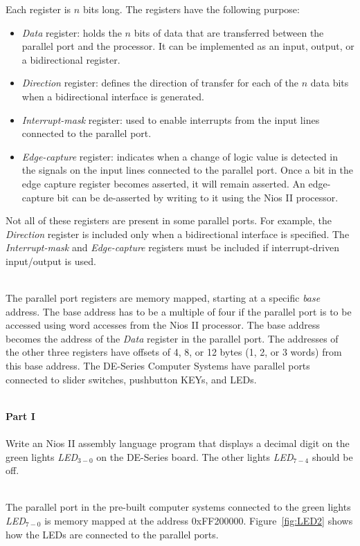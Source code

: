 \documentclass[epsfig,10pt,fullpage]{article}
\begin{document}
\noindent
Each register is $n$ bits long. The registers have the following purpose:
\begin{itemize}
\item {\it Data} register: holds the $n$ bits of data that are transferred between the parallel 
port and the processor. It can be implemented as an input, output, or a bidirectional register.
\item {\it Direction} register: defines the direction of transfer for each of the $n$
data bits when a bidirectional interface is generated.
\item {\it Interrupt-mask} register: used to enable interrupts from the
input lines connected to the parallel port.
\item {\it Edge-capture} register: indicates when a change of logic value is detected in 
the signals on the input lines connected to the parallel port. Once a bit in the edge
capture register becomes asserted, it will remain asserted. An edge-capture bit can be
de-asserted by writing to it using the Nios II processor.
\end{itemize}
\noindent
Not all of these registers are present in some parallel ports. For example,
the {\it Direction} register is included only when a bidirectional interface is specified.
The {\it Interrupt-mask} and {\it Edge-capture} registers must be included if
interrupt-driven input/output is used.

~\\
The parallel port registers are memory mapped, starting at a specific {\it base} address.
The base address has to be a multiple of four if the parallel port is to be accessed using
word accesses from the Nios II processor. The base address becomes the address of the {\it Data} 
register in the parallel port. The addresses of the other three registers have offsets 
of 4, 8, or 12 bytes (1, 2, or 3 words) from this base address.
The DE-Series Computer Systems have parallel ports connected to slider switches, pushbutton KEYs,
and LEDs.

~\\
\noindent
{\bf Part I}
~\\
~\\
\noindent
Write an Nios II assembly language program that displays a decimal digit on the green 
lights {\it LED}$_{3-0}$ on the DE-Series board. The other lights {\it LED}$_{7-4}$
should be off. 

~\\
\noindent
The parallel port in the pre-built computer systems connected to the green lights
{\it LED}$_{7-0}$ is memory mapped at the address {\sf 0xFF200000}. 
Figure~\ref{fig:LED2} shows how the LEDs are connected to the parallel ports.  
\end{document}
